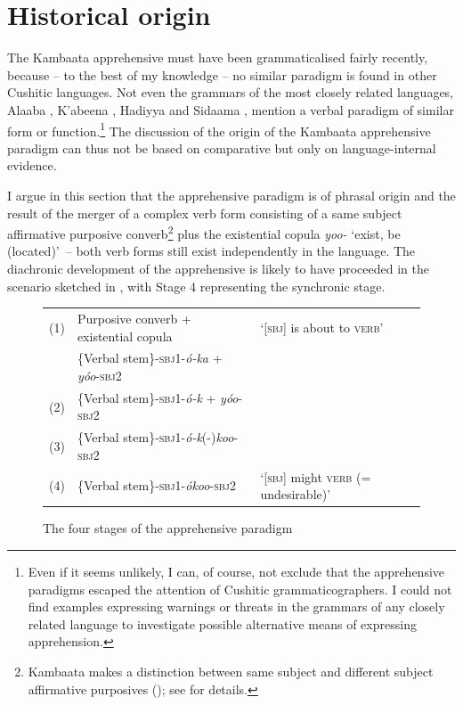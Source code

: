 \documentclass[output=paper,colorlinks,citecolor=brown,
]{langsci/langscibook}
\begin{document}
\section{Historical origin}\label{sec:treis:5}

The Kambaata apprehensive must have been grammaticalised fairly recently, because -- to the best of my knowledge -- no similar paradigm is found in other Cushitic languages. Not even the grammars of the most closely related languages, Alaaba \citep{Schneider-Blum2007}, K'abeena \citep{Crass2005}, Hadiyya \citep{Tadesse2015} and Sidaama \citep{Kawachi2007,Anbessa2014}, mention a verbal paradigm of similar form or function.\footnote{Even if it seems unlikely, I can, of course, not exclude that the apprehensive paradigms escaped the attention of Cushitic grammaticographers. I could not find examples expressing warnings or threats in the grammars of any closely related language to investigate possible alternative means of expressing apprehension.} The discussion of the origin of the Kambaata apprehensive paradigm can thus not be based on comparative but only on language-internal evidence.

I argue in this section that the apprehensive paradigm is of phrasal origin and the result of the merger of a complex verb form consisting of a same subject affirmative purposive converb\footnote{Kambaata makes a distinction between same subject and different subject affirmative purposives (); see \citet{Treis2010} for details.} plus the existential copula \textit{yoo-} `exist, be (located)'~-- both verb forms still exist independently in the language. The diachronic development of the apprehensive is likely to have proceeded in the scenario sketched in , with Stage 4 representing the synchronic stage.

\begin{figure}[ht]
\small%
\begin{tabular}{lll}
(1) & Purposive converb + existential copula & `[\textsc{sbj}] is about to \textsc{verb}'\\
& \{Verbal stem\}-\textsc{sbj1}-\textit{ó-ka} + \textit{yóo}-\textsc{sbj2} &\phantom{a}\\
(2) & \{Verbal stem\}-\textsc{sbj1}-\textit{ó-k} + \textit{yóo}-\textsc{sbj2} & \phantom{a}\\
(3) & \{Verbal stem\}-\textsc{sbj1}-\textit{ó-k}(-)\textit{koo}-\textsc{sbj2}&\phantom{a}\\
(4) & \{Verbal stem\}-\textsc{sbj1}-\textit{ókoo}-\textsc{sbj2} & `[\textsc{sbj}] might \textsc{verb} (= undesirable)'\\ 
\end{tabular}\caption{The four stages of the apprehensive paradigm}
\label{fig:treis:5}\end{figure}
\end{document}
